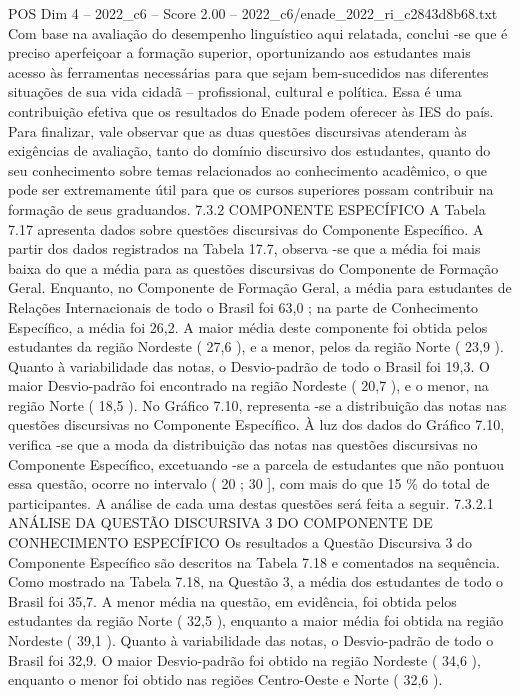 \begin{textsample}{POS Dim 4 – 2022\_c6 – Score 2.00 – 2022\_c6/enade\_2022\_ri\_c2843d8b68.txt}
Com base na avaliação do desempenho linguístico aqui relatada, conclui -se que é preciso aperfeiçoar a formação superior, oportunizando aos estudantes mais acesso às ferramentas necessárias para que sejam bem-sucedidos nas diferentes situações de sua vida cidadã – profissional, cultural e política.
Essa é uma contribuição efetiva que os resultados do Enade podem oferecer às IES do país.
Para finalizar, vale observar que as duas questões discursivas atenderam às exigências de avaliação, tanto do domínio discursivo dos estudantes, quanto do seu conhecimento sobre temas relacionados ao conhecimento acadêmico, o que pode ser extremamente útil para que os cursos superiores possam contribuir na formação de seus graduandos. 7.3.2 COMPONENTE ESPECÍFICO A Tabela 7.17 apresenta dados sobre questões discursivas do Componente Específico.
A partir dos dados registrados na Tabela 17.7, observa -se que a média foi mais baixa do que a média para as questões discursivas do Componente de Formação Geral.
Enquanto, no Componente de Formação Geral, a média para estudantes de Relações Internacionais de todo o Brasil foi 63,0 ; na parte de Conhecimento Específico, a média foi 26,2.
A maior média deste componente foi obtida pelos estudantes da região Nordeste ( 27,6 ), e a menor, pelos da região Norte ( 23,9 ).
Quanto à variabilidade das notas, o Desvio-padrão de todo o Brasil foi 19,3.
O maior Desvio-padrão foi encontrado na região Nordeste ( 20,7 ), e o menor, na região Norte ( 18,5 ).
No Gráfico 7.10, representa -se a distribuição das notas nas questões discursivas no Componente Específico.
À luz dos dados do Gráfico 7.10, verifica -se que a moda da distribuição das notas nas questões discursivas no Componente Específico, excetuando -se a parcela de estudantes que não pontuou essa questão, ocorre no intervalo ( 20 ; 30 ], com mais do que 15 \% do total de participantes.
A análise de cada uma destas questões será feita a seguir. 7.3.2.1 ANÁLISE DA QUESTÃO DISCURSIVA 3 DO COMPONENTE DE CONHECIMENTO ESPECÍFICO Os resultados a Questão Discursiva 3 do Componente Específico são descritos na Tabela 7.18 e comentados na sequência.
Como mostrado na Tabela 7.18, na Questão 3, a média dos estudantes de todo o Brasil foi 35,7.
A menor média na questão, em evidência, foi obtida pelos estudantes da região Norte ( 32,5 ), enquanto a maior média foi obtida na região Nordeste ( 39,1 ).
Quanto à variabilidade das notas, o Desvio-padrão de todo o Brasil foi 32,9.
O maior Desvio-padrão foi obtido na região Nordeste ( 34,6 ), enquanto o menor foi obtido nas regiões Centro-Oeste e Norte ( 32,6 ).

\end{textsample}
